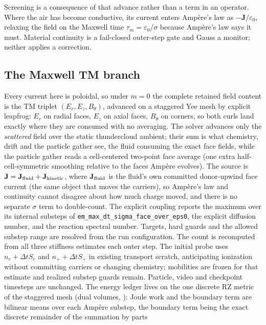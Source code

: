 \documentclass[11pt]{article}
\DeclareRobustCommand{\code}[1]{\ifmmode\text{\ttfamily#1}\else\nolinkurl{#1}\fi}
\begin{document}
Screening is a consequence of that advance rather than a term in an operator.
Where the air has become conductive, its current enters Amp\`ere's law as
$-\mathbf J/\varepsilon_0$, relaxing the field on the Maxwell time
$\tau_m = \varepsilon_0/\sigma$ because Amp\`ere's law says it must.
Material continuity is a fail-closed outer-step gate and Gauss a monitor;
neither applies a correction.

\subsection{The Maxwell TM branch}
\label{sec:field-maxwell}

Every current here is poloidal, so under $m=0$ the complete retained field
content is the TM triplet $(E_r, E_z, B_\theta)$, advanced on a staggered
Yee mesh by explicit leapfrog: $E_r$ on radial faces, $E_z$ on axial faces,
$B_\theta$ on corners, so both curls land exactly where they are consumed
with no averaging. The solver advances only the \emph{scattered} field over
the static thundercloud ambient; their sum is what chemistry, drift and the
particle gather see, the fluid consuming the exact face fields, while the
particle gather reads a cell-centered two-point face average (one extra
half-cell-symmetric smoothing relative to the faces Amp\`ere evolves). The source is $\mathbf{J} = \mathbf{J}_{\rm fluid} +
\mathbf{J}_{\rm kinetic}$, where $\mathbf{J}_{\rm fluid}$ is the fluid's own
committed donor-upwind face current (the same object that moves the
carriers), so Amp\`ere's law and continuity cannot disagree about how much
charge moved, and there is no separate $\sigma$ term to double-count.
The explicit coupling reports the maximum over its internal substeps of
\code{em\_max\_dt\_sigma\_face\_over\_eps0}, the explicit diffusion number,
and the reaction spectral number. Targets, hard guards and the allowed substep
range are resolved from the run configuration. The count is recomputed from all
three stiffness estimates each outer step. The initial probe uses
$n_e+\Delta t S_e$ and $n_++\Delta t S_+$ in existing transport scratch,
anticipating ionization without committing carriers or changing chemistry;
mobilities are frozen for that estimate and realized substep guards remain.
Particle, video and checkpoint timesteps are unchanged. The energy ledger lives on the one discrete RZ
metric of the staggered mesh (dual volumes, ): Joule
work and the boundary term are bilinear means over each Amp\`ere substep, the
boundary term being the exact discrete remainder of the summation by parts
\end{document}
